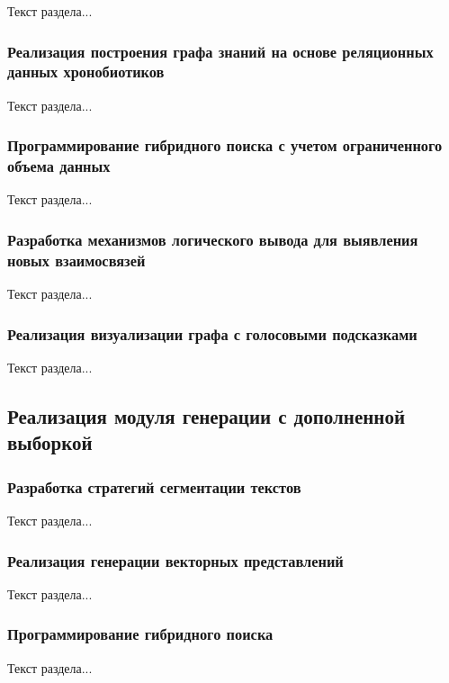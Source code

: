 Текст раздела...

\subsubsection{Реализация построения графа знаний на основе реляционных данных хронобиотиков}

Текст раздела...

\subsubsection{Программирование гибридного поиска с учетом ограниченного объема данных}

Текст раздела...

\subsubsection{Разработка механизмов логического вывода для выявления новых взаимосвязей}

Текст раздела...

\subsubsection{Реализация визуализации графа с голосовыми подсказками}

Текст раздела...

\subsection{Реализация модуля генерации с дополненной выборкой}

\subsubsection{Разработка стратегий сегментации текстов}

Текст раздела...

\subsubsection{Реализация генерации векторных представлений}

Текст раздела...

\subsubsection{Программирование гибридного поиска}

Текст раздела...

